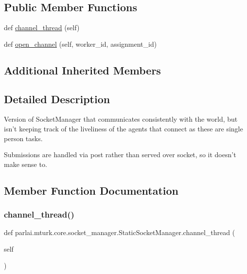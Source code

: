 \subsection*{Public Member Functions}
\begin{DoxyCompactItemize}
\item 
def \hyperlink{classparlai_1_1mturk_1_1core_1_1socket__manager_1_1StaticSocketManager_ac141271b1df6f50a5bfee040d7904696}{channel\+\_\+thread} (self)
\item 
def \hyperlink{classparlai_1_1mturk_1_1core_1_1socket__manager_1_1StaticSocketManager_a4672bc8a07f4ae122338ceb3a59cd54a}{open\+\_\+channel} (self, worker\+\_\+id, assignment\+\_\+id)
\end{DoxyCompactItemize}
\subsection*{Additional Inherited Members}


\subsection{Detailed Description}
\begin{DoxyVerb}Version of SocketManager that communicates consistently with the world, but isn't
keeping track of the liveliness of the agents that connect as these are single
person tasks.

Submissions are handled via post rather than served over socket, so it doesn't make
sense to.
\end{DoxyVerb}
 

\subsection{Member Function Documentation}
\mbox{\label{classparlai_1_1mturk_1_1core_1_1socket__manager_1_1StaticSocketManager_ac141271b1df6f50a5bfee040d7904696}} 
\subsubsection{\texorpdfstring{channel\+\_\+thread()}{channel\_thread()}}
{\footnotesize\ttfamily def parlai.\+mturk.\+core.\+socket\+\_\+manager.\+Static\+Socket\+Manager.\+channel\+\_\+thread (\begin{DoxyParamCaption}\item[{}]{self }\end{DoxyParamCaption})}

